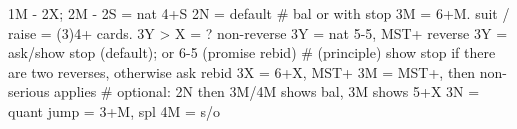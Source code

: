 1M - 2X; 2M -
2S = nat 4+S
2N = default  # bal or with stop
    3M = 6+M. suit / raise = (3)4+ cards. 3Y > X = ?
non-reverse 3Y = nat 5-5, MST+ 
reverse 3Y = ask/show stop (default); or 6-5 (promise rebid)
    # (principle) show stop if there are two reverses, otherwise ask 
rebid 3X = 6+X, MST+
3M = MST+, then non-serious applies
    # optional: 2N then 3M/4M shows bal, 3M shows 5+X
3N = quant
jump = 3+M, spl
4M = s/o